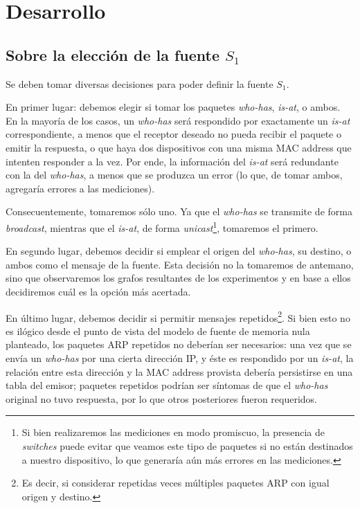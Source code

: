 \section{Desarrollo}

\subsection{Sobre la elección de la fuente $S_1$}

\par Se deben tomar diversas decisiones para poder definir la fuente $S_1$.
\par En primer lugar: debemos elegir si tomar los paquetes \textit{who-has}, \textit{is-at}, o ambos.
En la mayoría de los casos, un \textit{who-has} será respondido por exactamente un \textit{is-at} correspondiente, a menos que el receptor deseado no pueda recibir el paquete o emitir la respuesta, o que haya dos dispositivos con una misma MAC address que intenten responder a la vez.
Por ende, la información del \textit{is-at} será redundante con la del \textit{who-has}, a menos que se produzca un error (lo que, de tomar ambos, agregaría errores a las mediciones).

\par Consecuentemente, tomaremos sólo uno.
Ya que el \textit{who-has} se transmite de forma \textit{broadcast}, mientras que el \textit{is-at}, de forma \textit{unicast}\footnote{Si bien realizaremos las mediciones en modo promiscuo, la presencia de \textit{switches} puede evitar que veamos este tipo de paquetes si no están destinados a nuestro dispositivo, lo que generaría aún más errores en las mediciones.}, tomaremos el primero.

\par En segundo lugar, debemos decidir si emplear el origen del \textit{who-has}, su destino, o ambos como el mensaje de la fuente.
Esta decisión no la tomaremos de antemano, sino que observaremos los grafos resultantes de los experimentos y en base a ellos decidiremos cuál es la opción más acertada.

\par En último lugar, debemos decidir si permitir mensajes repetidos\footnote{Es decir, si considerar repetidas veces múltiples paquetes ARP con igual origen y destino.}. 
Si bien esto no es ilógico desde el punto de vista del modelo de fuente de memoria nula planteado, los paquetes ARP repetidos no deberían ser necesarios: una vez que se envía un \textit{who-has} por una cierta dirección IP, y éste es respondido por un \textit{is-at}, la relación entre esta dirección y la MAC address provista debería persistirse en una tabla del emisor; paquetes repetidos podrían ser síntomas de que el \textit{who-has} original no tuvo respuesta, por lo que otros posteriores fueron requeridos.

